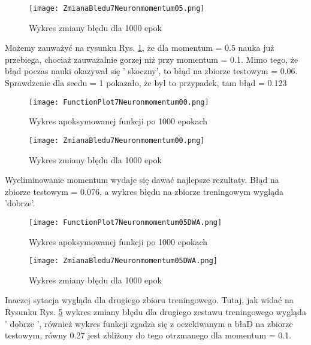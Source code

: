\documentclass[12pt]{article}
\begin{document}
\begin{figure}[!htb]
 \centering
 \texttt{[image: ZmianaBledu7Neuronmomentum05.png]}
 \vspace{-0.3cm}
 \caption{Wykres zmiany błędu dla 1000 epok}
 \label{WykresBlad9}
\end{figure}


\newpage
Możemy zauważyć na rysunku Rys. \ref{WykresBlad9}, że dla momentum = 0.5 nauka już przebiega, chociaż zauważalnie gorzej niż przy momentum = 0.1.
Mimo tego, że błąd poczas nauki okazywał się ' skoczny', to błąd na zbiorze testowym = 0.06. Sprawdzenie dla seedu = 1 pokazało, że był to przypadek, tam błąd = 0.123
\newpage


\begin{figure}[!htb]
 \centering
 \texttt{[image: FunctionPlot7Neuronmomentum00.png]}
 \caption{Wykres apoksymowanej funkcji po 1000 epokach}
 \vspace{-0.3cm}
 \label{WykresFun10}
\end{figure}

\begin{figure}[!htb]
 \centering
 \texttt{[image: ZmianaBledu7Neuronmomentum00.png]}
 \vspace{-0.3cm}
 \caption{Wykres zmiany błędu dla 1000 epok}
 \label{WykresBlad10}
\end{figure}


\newpage
Wyeliminowanie momentum wydaje się dawać najlepsze rezultaty. Błąd na zbiorze testowym = 0.076, a wykres błędu na zbiorze treningowym wygląda 'dobrze'.



\begin{figure}[!htb]
 \centering
 \texttt{[image: FunctionPlot7Neuronmomentum05DWA.png]}
 \caption{Wykres apoksymowanej funkcji po 1000 epokach}
 \vspace{-0.3cm}
 \label{WykresFun11}
\end{figure}

\begin{figure}[!htb]
 \centering
 \texttt{[image: ZmianaBledu7Neuronmomentum05DWA.png]}
 \vspace{-0.3cm}
 \caption{Wykres zmiany błędu dla 1000 epok}
 \label{WykresBlad11}
\end{figure}

\newpage

Inaczej sytacja wygląda dla drugiego zbioru treningowego. Tutaj, jak widać na Rysunku Rys. \ref{WykresBlad11} wykres zmiany błędu dla drugiego zestawu treningowego wygląda ' dobrze ', również wykres funkcji zgadza się z oczekiwanym a błaD na zbiorze testowym, równy 0.27 jest zbliżony do tego otrzmanego dla momentum = 0.1.
\end{document}
